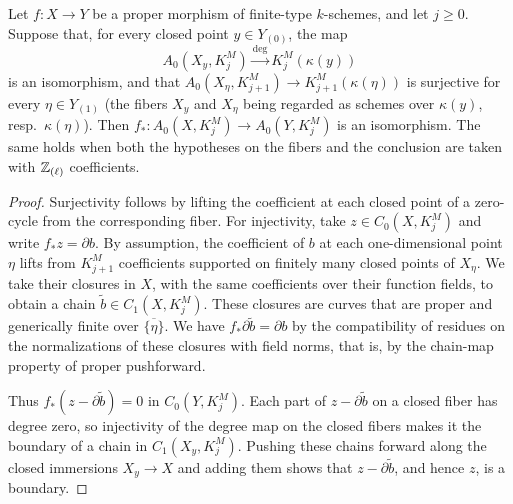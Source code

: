 \begin{lemma}
\label{lem:review-proper-cycle-pushforward}
Let $f:X\to Y$ be a proper morphism of finite-type $k$-schemes, and let $j\ge0$.
Suppose that, for every closed point $y\in Y_{(0)}$, the map
\[
 A_0(X_y,K_j^M)\xrightarrow{\deg}K_j^M(\kappa(y))
\]
is an isomorphism, and that $A_0(X_\eta,K_{j+1}^M)\to K_{j+1}^M(\kappa(\eta))$ is surjective for every $\eta\in Y_{(1)}$ (the fibers $X_y$ and $X_\eta$ being regarded as schemes over $\kappa(y)$, resp.\ $\kappa(\eta)$).
Then $f_*:A_0(X,K_j^M)\to A_0(Y,K_j^M)$ is an isomorphism.
The same holds when both the hypotheses on the fibers and the conclusion are taken with $\mathbb Z_{(\ell)}$ coefficients.
\end{lemma}
\begin{proof}
Surjectivity follows by lifting the coefficient at each closed point of a zero-cycle from the corresponding fiber.
For injectivity, take $z\in C_0(X,K_j^M)$ and write $f_*z=\partial b$.
By assumption, the coefficient of $b$ at each one-dimensional point $\eta$ lifts from $K_{j+1}^M$ coefficients supported on finitely many closed points of $X_\eta$.
We take their closures in $X$, with the same coefficients over their function fields, to obtain a chain $\widetilde b\in C_1(X,K_j^M)$.
These closures are curves that are proper and generically finite over $\overline{\{\eta\}}$.
We have $f_*\partial\widetilde b=\partial b$ by the compatibility of residues on the normalizations of these closures with field norms, that is, by the chain-map property of proper pushforward.

Thus $f_*(z-\partial\widetilde b)=0$ in $C_0(Y,K_j^M)$.
Each part of $z-\partial\widetilde b$ on a closed fiber has degree zero, so injectivity of the degree map on the closed fibers makes it the boundary of a chain in $C_1(X_y,K_j^M)$.
Pushing these chains forward along the closed immersions $X_y\to X$ and adding them shows that $z-\partial\widetilde b$, and hence $z$, is a boundary.
\end{proof}

